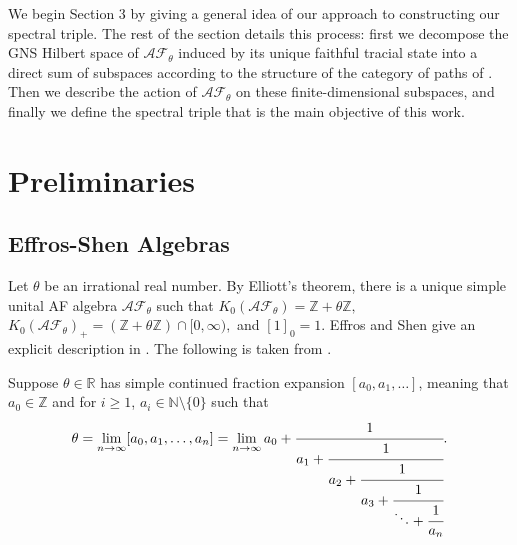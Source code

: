 \documentclass[12pt]{amsart}
\newcommand{\AF}{\mathcal{A}\mathcal{F}}
\newcommand{\nifty}{n\to\infty}
\newcommand{\N}{\mathbb{N}}
\newcommand{\R}{\mathbb{R}}
\newcommand{\Z}{\mathbb{Z}}
\theoremstyle{plain} %
\theoremstyle{definition} %
\begin{document}
We begin Section 3 by giving a general idea of our approach to constructing our
spectral triple. The rest of the section details this process: first we decompose the
GNS Hilbert space of  $\mathcal{AF}_\theta$ induced by its unique faithful tracial state into a direct
sum of subspaces according to the structure of the category of paths of \cite{MS22}. Then
we describe the action of $\mathcal{AF}_\theta$ on these finite-dimensional subspaces, and finally we define the spectral triple that is the main objective of this work.




\section{Preliminaries}
\subsection{Effros-Shen 
Algebras}

Let $\theta$ be an irrational real number. By Elliott's theorem, there is a unique simple unital AF algebra $\AF_{\theta}$ such that $K_0(\AF_{\theta}) = \Z + \theta \Z,$ $K_0(\AF_{\theta})_+ = (\Z + \theta \Z)\cap [0, \infty),$ and $[1]_0 = 1$. Effros and Shen give an explicit description in \cite{ES80}. The following is taken from \cite[VI.3]{Dav96}.

Suppose $\theta \in \R$ has simple continued fraction expansion $[a_0, a_1, \dots]$, meaning that $a_0 \in \Z$ and for $i \geq 1$, $a_i \in \N \setminus \{0\}$ such that
\begin{align*}
    \theta = \lim_{\nifty} [a_0, a_1, \dots, a_n] = \lim_{\nifty} a_0 + \cfrac{1}{a_1 + \cfrac{1}{a_2 + \cfrac{1}{a_3 + \cfrac{1}{\ddots + \cfrac{1}{a_n}}}}}.
\end{align*}
\end{document}

